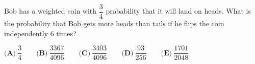 Bob has a weighted coin with $\dfrac{3}{4}$ probability that it will land on heads. What is the probability that Bob gets more heads than tails if he flips the coin independently $6$ times?

$\textbf{(A)}~\dfrac{3}{4}\qquad\textbf{(B)}~\dfrac{3367}{4096}\qquad\textbf{(C)}~\dfrac{3403}{4096}\qquad\textbf{(D)}~\dfrac{93}{256}\qquad\textbf{(E)}~\dfrac{1701}{2048}\qquad$
